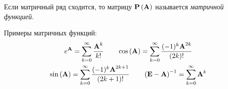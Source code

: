 \begin{definition}
    Если матричный ряд сходится, то матрицу $\bf{P} \left( \bf{A} \right)$ называется
    \emph{матричной функцией}.
\end{definition}
Примеры матричных функций:
\begin{gather*}
    e^{\bf{A}} = \sum_{k=0}^{\infty} \frac{\bf{A}^k}{k!} \qquad \cos\left( \bf{A} \right) = \sum_{k=0}^{\infty} \frac{(-1)^k \bf{A}^{2k}}{(2k)!} \\
    \sin \left( \bf{A} \right) = \sum_{k=0}^{\infty} \frac{(-1)^k \bf{A}^{2k + 1}}{(2k+1)!} \qquad \left( \bf{E} - \bf{A} \right)^{-1} = \sum_{k=0}^{\infty} \bf{A}^k
\end{gather*}
